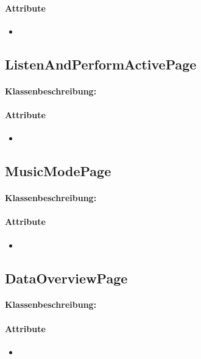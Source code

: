 \documentclass[a4paper,12pt]{article}
\begin{document}
	\paragraph{Attribute}
		\begin{itemize}
			\item
		\end{itemize}

	\subsection{ListenAndPerformActivePage}
	\paragraph{Klassenbeschreibung:}
	\paragraph{Attribute}
		\begin{itemize}
			\item
		\end{itemize}

	\subsection{MusicModePage}
	\paragraph{Klassenbeschreibung:}
	\paragraph{Attribute}
		\begin{itemize}
			\item
		\end{itemize}

	\subsection{DataOverviewPage}
	\paragraph{Klassenbeschreibung:}
	\paragraph{Attribute}
		\begin{itemize}
			\item
		\end{itemize}
\end{document}
